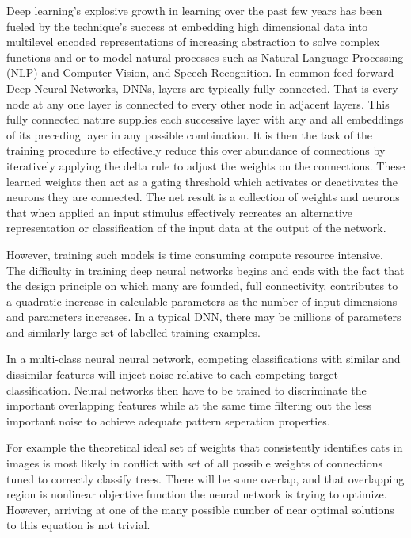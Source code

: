 \documentclass{llncs}
\begin{document}
Deep learning’s explosive growth in learning over the past few years has been fueled by the technique’s success at embedding high dimensional data into multilevel encoded representations of increasing abstraction to solve complex functions and or to model natural processes such as Natural Language Processing (NLP) and Computer Vision, and Speech Recognition. In common feed forward Deep Neural Networks, DNNs, layers are typically fully connected.  That is every node at any one layer is connected to every other node in adjacent layers.  This fully connected nature supplies each successive layer with any and all embeddings of its preceding layer in any possible combination. It is then the task of the training procedure to effectively reduce this over abundance of connections by iteratively applying the delta rule to adjust the weights on the connections.  These learned weights then act as a gating threshold which activates or deactivates the neurons they are connected.  The net result is a collection of weights and neurons that when applied an input stimulus effectively recreates an alternative representation or classification of the input data at the output of the network.

However, training such models is time consuming compute resource intensive.  The difficulty in training deep neural networks begins and ends with the fact that the design principle on which many are founded, full connectivity, contributes to a quadratic increase in calculable parameters as the number of input dimensions and parameters increases.  In a typical DNN, there may be millions of parameters and similarly large set of labelled training examples.

In a multi-class neural neural network, competing classifications with similar and dissimilar features will inject noise relative to each competing target classification. Neural networks then have to be trained to discriminate the important overlapping features while at the same time filtering out the less important noise to achieve adequate pattern seperation properties.

For example the theoretical ideal set of weights that consistently identifies cats in images is most likely in conflict with set of all possible weights of connections tuned to correctly classify trees.  There will be some overlap, and that overlapping region is nonlinear objective function the neural network is trying to optimize.  However, arriving at one of the many possible number of near optimal solutions to this equation is not trivial.
\end{document}
